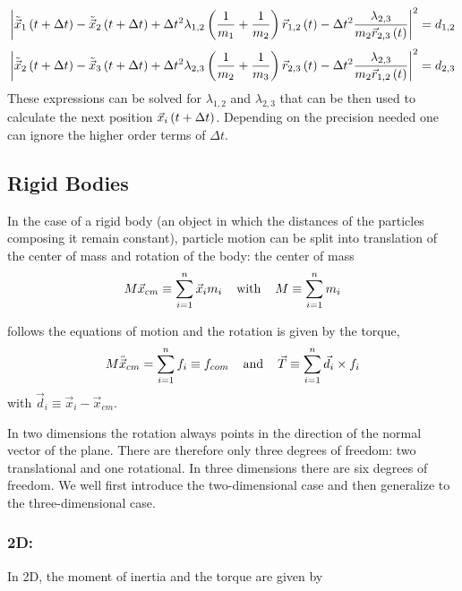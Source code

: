 $$
\left|      \tilde{ \vec{x}}_1 \left(t+\Delta t\right) -\tilde{  \vec{x}}_2 \left(t+\Delta t\right) + \Delta t^2 \lambda_{1,2} \left(\frac{1}{m_1} +\frac{1}{m_2}\right)\vec{r}_{1,2}\left(t\right)  - \Delta t^2 \frac{\lambda_{2,3}}{m_2 \vec{r}_{2,3}\left(t\right)}        \right|^2 = d_{1,2}
$$
$$
\left|      \tilde{  \vec{x}}_2 \left(t+\Delta t\right) - \tilde{ \vec{x}}_3 \left(t+\Delta t\right) + \Delta t^2 \lambda_{2,3} \left(\frac{1}{m_2} +\frac{1}{m_3}\right)\vec{r}_{2,3}\left(t\right)  - \Delta t^2 \frac{\lambda_{2,3}}{m_2 \vec{r}_{1,2}\left(t\right)}        \right|^2 = d_{2,3}
$$
These expressions can be solved  for $\lambda_{1,2}$ and $\lambda_{2,3}$ that can be then used to calculate the next position $\vec{x}_i\left(t+\Delta t\right)$. Depending on the precision needed one can ignore the higher order terms of $\Delta t$.


\subsection{Rigid Bodies}
In the case of a rigid body (an object in which the distances of the particles composing it remain constant), particle motion can be split into translation of the center of mass and rotation of the body: the center of mass
\begin{equation}
M\vec{x}_{cm} \equiv \sum_{i=1}^n{\vec{x}_im_i}
\hspace{0.4cm}\text{with}\hspace{0.4cm} 
M\equiv \sum_{i=1}^n{m_i}
\label{eq:center_of_mass}
\end{equation}

follows the equations of motion and the rotation is given by the torque,
\begin{equation}
M\ddot{\vec{x}}_{cm} = \sum_{i=1}^n{f_i} \equiv f_{com}
\hspace{0.4cm}\text{and}\hspace{0.4cm} 
\vec{T} \equiv \sum_{i=1}^n{     \vec{d}_i \times     f_i   }
\label{eq:cof_eom}
\end{equation}
with $\vec{d}_i \equiv \vec{x}_i - \vec{x}_{cm}$.

In two dimensions  the rotation always points in the direction of the normal vector of the plane. There are therefore only three degrees of freedom: two translational and one rotational. In three dimensions there are six degrees of freedom. We well first introduce the two-dimensional case and then generalize to the three-dimensional case.

\subsubsection*{2D:}
In 2D,  the moment of inertia and the torque are given by

